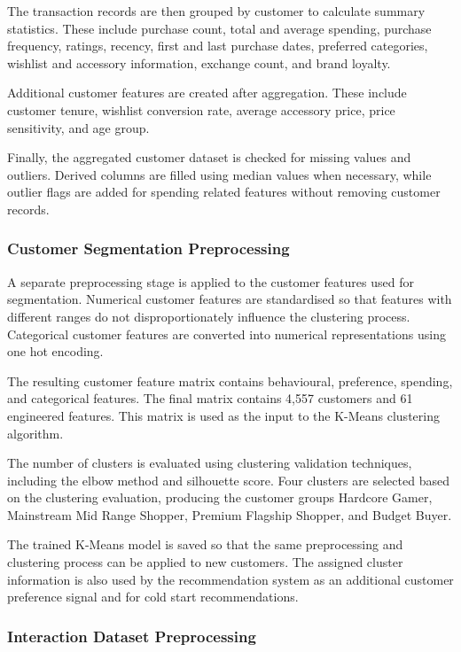 \documentclass[12pt]{report}
\numberwithin{figure}{chapter}
\numberwithin{table}{chapter}
\numberwithin{equation}{chapter}
\begin{document}
The transaction records are then grouped by customer to calculate summary statistics. These include purchase count, total and average spending, purchase frequency, ratings, recency, first and last purchase dates, preferred categories, wishlist and accessory information, exchange count, and brand loyalty.

Additional customer features are created after aggregation. These include customer tenure, wishlist conversion rate, average accessory price, price sensitivity, and age group.

Finally, the aggregated customer dataset is checked for missing values and outliers. Derived columns are filled using median values when necessary, while outlier flags are added for spending related features without removing customer records.


\subsubsection{Customer Segmentation Preprocessing}

A separate preprocessing stage is applied to the customer features used for segmentation. Numerical customer features are standardised so that features with different ranges do not disproportionately influence the clustering process. Categorical customer features are converted into numerical representations using one hot encoding.

The resulting customer feature matrix contains behavioural, preference, spending, and categorical features. The final matrix contains 4,557 customers and 61 engineered features. This matrix is used as the input to the K-Means clustering algorithm.

The number of clusters is evaluated using clustering validation techniques, including the elbow method and silhouette score. Four clusters are selected based on the clustering evaluation, producing the customer groups Hardcore Gamer, Mainstream Mid Range Shopper, Premium Flagship Shopper, and Budget Buyer.

The trained K-Means model is saved so that the same preprocessing and clustering process can be applied to new customers. The assigned cluster information is also used by the recommendation system as an additional customer preference signal and for cold start recommendations.


\subsubsection{Interaction Dataset Preprocessing}
\end{document}
